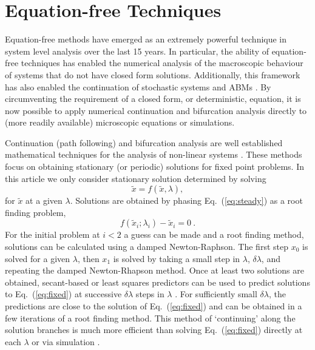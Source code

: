 \documentclass[11pt]{article}
\begin{document}
\section{Equation-free Techniques}
\label{sec:ef}
Equation-free methods \cite{Theodoropoulos2000} have emerged as an extremely powerful technique in system level analysis over the last 15 years. In particular, the ability of equation-free techniques has enabled the numerical analysis of the macroscopic behaviour of systems that do not have closed form solutions. Additionally, this framework has also enabled the continuation of stochastic systems \cite{Barkley2006} and ABMs \cite{Thomas2016limno}. By circumventing the requirement of a closed form, or deterministic, equation, it is now possible to apply numerical continuation and bifurcation analysis directly to (more readily available) microscopic equations or simulations. 

Continuation (path following) and bifurcation analysis are well established mathematical techniques for the analysis of non-linear systems \cite{Doedel1991,Seydel1987}. These methods focus on obtaining stationary
(or periodic) solutions for fixed point problems. In this article we only consider stationary solution determined by solving  
\begin{equation}
\tilde x = f(\tilde x, \lambda),
\label{eq:steady}
\end{equation}
for $\tilde x$ at a given $\lambda$. Solutions are obtained by phasing Eq.~(\ref{eq:steady}) as a root finding problem,
\begin{equation}
f(\tilde x_i;\lambda_i)-\tilde x_i=0~.
\label{eq:fixed}
\end{equation}
For the initial problem at $i<2$ a guess can be made and a root finding method, solutions can be calculated using a damped Newton-Raphson. The first step $x_0$ is  solved for a given $\lambda$, then $x_1$ is solved by taking a small step in $\lambda$, $\delta\lambda$, and repeating the damped Newton-Rhapson method. 
Once at least two solutions are obtained, secant-based or least squares predictors can be used to predict solutions to Eq.~(\ref{eq:fixed}) at successive $\delta\lambda$ steps in $\lambda$ \cite{Thomas2016ember}. For sufficiently small $\delta\lambda$, the predictions are close to the solution of Eq.~(\ref{eq:fixed})  and can be obtained in a few iterations of a root finding method. This method of `continuing' along the solution branches is much more efficient than solving Eq.~(\ref{eq:fixed}) directly at each $\lambda$ or via simulation \cite{Thomas2016limno}. 
\end{document}
